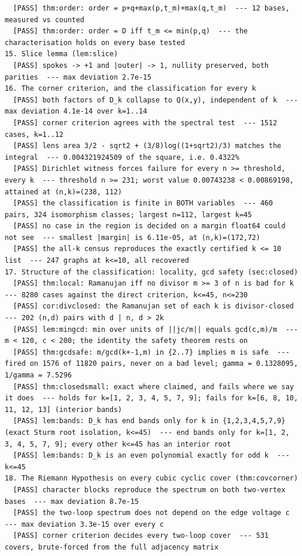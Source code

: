 \documentclass[11pt]{article}
\begin{document}
\begin{verbatim}
  [PASS] thm:order: order = p+q+max(p,t_m)+max(q,t_m)  --- 12 bases, measured vs counted
  [PASS] thm:order: order = D iff t_m <= min(p,q)  --- the characterisation holds on every base tested
15. Slice lemma (lem:slice)
  [PASS] spokes -> +1 and |outer| -> 1, nullity preserved, both parities  --- max deviation 2.7e-15
16. The corner criterion, and the classification for every k
  [PASS] both factors of D_k collapse to Q(x,y), independent of k  --- max deviation 4.1e-14 over k=1..14
  [PASS] corner criterion agrees with the spectral test  --- 1512 cases, k=1..12
  [PASS] lens area 3/2 - sqrt2 + (3/8)log((1+sqrt2)/3) matches the integral  --- 0.004321924509 of the square, i.e. 0.4322%
  [PASS] Dirichlet witness forces failure for every n >= threshold, every k  --- threshold n >= 231; worst value 0.00743238 < 0.00869198, attained at (n,k)=(238, 112)
  [PASS] the classification is finite in BOTH variables  --- 460 pairs, 324 isomorphism classes; largest n=112, largest k=45
  [PASS] no case in the region is decided on a margin float64 could not see  --- smallest |margin| is 6.11e-05, at (n,k)=(172,72)
  [PASS] the all-k census reproduces the exactly certified k <= 10 list  --- 247 graphs at k<=10, all recovered
17. Structure of the classification: locality, gcd safety (sec:closed)
  [PASS] thm:local: Ramanujan iff no divisor m >= 3 of n is bad for k  --- 8280 cases against the direct criterion, k<=45, n<=230
  [PASS] cor:divclosed: the Ramanujan set of each k is divisor-closed  --- 202 (n,d) pairs with d | n, d > 2k
  [PASS] lem:mingcd: min over units of ||jc/m|| equals gcd(c,m)/m  --- m < 120, c < 200; the identity the safety theorem rests on
  [PASS] thm:gcdsafe: m/gcd(k+-1,m) in {2..7} implies m is safe  --- fired on 1576 of 11820 pairs, never on a bad level; gamma = 0.1328095, 1/gamma = 7.5296
  [PASS] thm:closedsmall: exact where claimed, and fails where we say it does  --- holds for k=[1, 2, 3, 4, 5, 7, 9]; fails for k=[6, 8, 10, 11, 12, 13] (interior bands)
  [PASS] lem:bands: D_k has end bands only for k in {1,2,3,4,5,7,9} (exact Sturm root isolation, k<=45)  --- end bands only for k=[1, 2, 3, 4, 5, 7, 9]; every other k<=45 has an interior root
  [PASS] lem:bands: D_k is an even polynomial exactly for odd k  --- k<=45
18. The Riemann Hypothesis on every cubic cyclic cover (thm:covcorner)
  [PASS] character blocks reproduce the spectrum on both two-vertex bases  --- max deviation 8.7e-15
  [PASS] the two-loop spectrum does not depend on the edge voltage c  --- max deviation 3.3e-15 over every c
  [PASS] corner criterion decides every two-loop cover  --- 531 covers, brute-forced from the full adjacency matrix

\end{verbatim}
\end{document}
